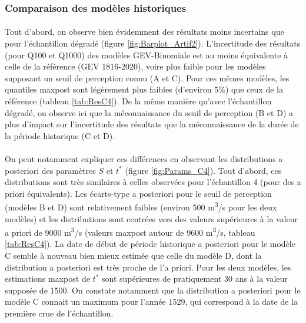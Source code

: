 		\subsubsection{Comparaison des modèles historiques}
		
		
	\paragraph{} Tout d'abord, on observe bien évidemment des résultats moins incertains que pour l'échantillon dégradé (figure \ref{fig:Barplot_Artif2}). L'incertitude des résultats (pour Q100 et Q1000) des modèles GEV-Binomiale est au moins équivalente à celle de la référence (GEV 1816-2020), voire plus faible pour les modèles supposant un seuil de perception connu (A et C). Pour ces mêmes modèles, les quantiles maxpost sont légèrement plus faibles (d'environ 5\%) que ceux de la référence (tableau \ref{tab:ResC4}). De la même manière qu'avec l'échantillon dégradé, on observe ici que la méconnaissance du seuil de perception (B et D) a plus d'impact sur l'incertitude des résultats que la méconnaissance de la durée de la période historique (C et D). 
	
	\paragraph{} On peut notamment expliquer ces différences en observant les distributions a posteriori des paramètres $S$ et $t^{*}$ (figure \ref{fig:Params_C4}). Tout d'abord, ces distributions sont très similaires à celles observées pour l'échantillon 4 (pour des a priori équivalents). Les écarts-type a posteriori pour le seuil de perception (modèles B et D) sont relativement faibles (environ 500 m\textsuperscript{3}/s pour les deux modèles) et les distributions sont centrées vers des valeurs supérieures à la valeur a priori de 9000 m\textsuperscript{3}/s (valeurs maxpost autour de 9600 m\textsuperscript{3}/s, tableau \ref{tab:ResC4}). La date de début de période historique a posteriori pour le modèle C semble à nouveau bien mieux estimée que celle du modèle D, dont la distribution a posteriori est très proche de l'a priori. Pour les deux modèles, les estimations maxpost de $t^*$ sont supérieures de pratiquement 30 ans à la valeur supposée de 1500. On constate notamment que la distribution a posteriori pour le modèle C connait un maximum pour l'année 1529, qui correspond à la date de la première crue de l'échantillon. 
	

